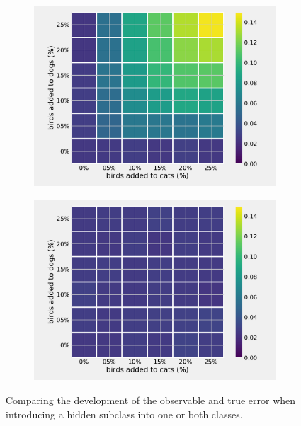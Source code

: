 \documentclass[a4paper,11pt]{scrartcl}
\theoremstyle{definition}
\begin{document}
\begin{figure}%
\centering
\begin{subfigure}[t]{0.49\textwidth}
\includegraphics[width=0.99\textwidth]{Plots_4/1000_ovalid_images_hidden.pdf}
\label{subfig:observable_heatmap_hidden}
\end{subfigure}
\begin{subfigure}[t]{0.49\textwidth}
\includegraphics[width=0.99\textwidth]{Plots_4/1000_tvalid_images_hidden.pdf}
\label{subfig:tue_heatmap_hidden}
\end{subfigure}
\caption[Heatmaps comparing error rates when introducing a hidden class.]{Comparing the development of the observable and true error when introducing a hidden subclass into one or both classes.}
\label{fig:heatmaps_hidden}
\end{figure}
\end{document}
